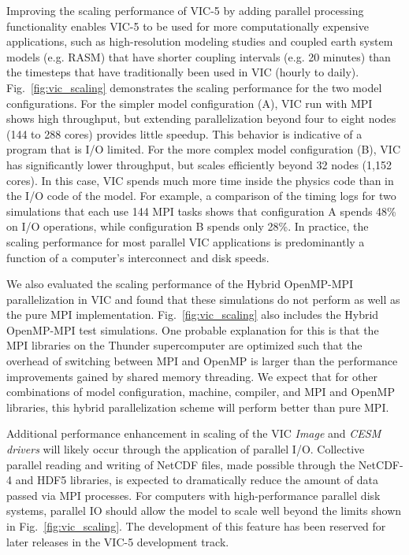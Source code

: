 \documentclass[gmd, manuscript]{copernicus}
\begin{document}
  Improving the scaling performance of VIC-5 by adding parallel processing functionality enables VIC-5 to be used for more computationally expensive applications, such as high-resolution modeling studies and coupled earth system models (e.g. RASM) that have shorter coupling intervals (e.g. 20 minutes) than the timesteps that have traditionally been used in VIC (hourly to daily). Fig.~\ref{fig:vic_scaling} demonstrates the scaling performance for the two model configurations. For the simpler model configuration (A), VIC run with MPI shows high throughput, but extending parallelization beyond four to eight nodes (144 to 288 cores) provides little speedup. This behavior is indicative of a program that is I/O limited. For the more complex model configuration (B), VIC has significantly lower throughput, but scales efficiently beyond 32 nodes (1,152 cores). In this case, VIC spends much more time inside the physics code than in the I/O code of the model. For example, a comparison of the timing logs for two simulations that each use 144 MPI tasks shows that configuration A spends 48\% on I/O operations, while configuration B spends only 28\%. In practice, the scaling performance for most parallel VIC applications is predominantly a function of a computer's interconnect and disk speeds.

  We also evaluated the scaling performance of the Hybrid OpenMP-MPI parallelization in VIC and found that these simulations do not perform as well as the pure MPI implementation. Fig.~\ref{fig:vic_scaling} also includes the Hybrid OpenMP-MPI test simulations. One probable explanation for this is that the MPI libraries on the Thunder supercomputer are optimized such that the overhead of switching between MPI and OpenMP is larger than the performance improvements gained by shared memory threading. We expect that for other combinations of model configuration, machine, compiler, and MPI and OpenMP libraries, this hybrid parallelization scheme will perform better than pure MPI.

  Additional performance enhancement in scaling of the VIC \textit{Image} and \textit{CESM drivers} will likely occur through the application of parallel I/O. Collective parallel reading and writing of NetCDF files, made possible through the NetCDF-4 and HDF5 libraries, is expected to dramatically reduce the amount of data passed via MPI processes. For computers with high-performance parallel disk systems, parallel IO should allow the model to scale well beyond the limits shown in Fig.~\ref{fig:vic_scaling}. The development of this feature has been reserved for later releases in the VIC-5 development track.
\end{document}

